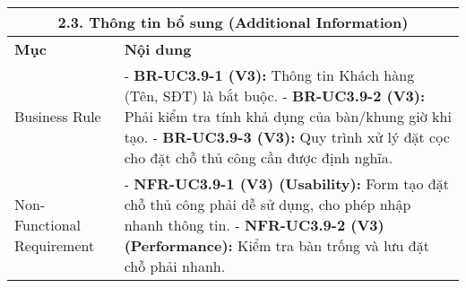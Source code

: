 \begin{longtable}{|m{4cm}|p{11cm}|}
\hline
\multicolumn{2}{|c|}{\textbf{2.3. Thông tin bổ sung (Additional Information)}} \\
\hline
\textbf{Mục} & \textbf{Nội dung} \\
\hline
Business Rule & - \textbf{BR-UC3.9-1 (V3):} Thông tin Khách hàng (Tên, SĐT) là bắt buộc. \newline - \textbf{BR-UC3.9-2 (V3):} Phải kiểm tra tính khả dụng của bàn/khung giờ khi tạo. \newline - \textbf{BR-UC3.9-3 (V3):} Quy trình xử lý đặt cọc cho đặt chỗ thủ công cần được định nghĩa. \\
\hline
Non-Functional Requirement & - \textbf{NFR-UC3.9-1 (V3) (Usability):} Form tạo đặt chỗ thủ công phải dễ sử dụng, cho phép nhập nhanh thông tin. \newline - \textbf{NFR-UC3.9-2 (V3) (Performance):} Kiểm tra bàn trống và lưu đặt chỗ phải nhanh. \\
\hline
\end{longtable}

